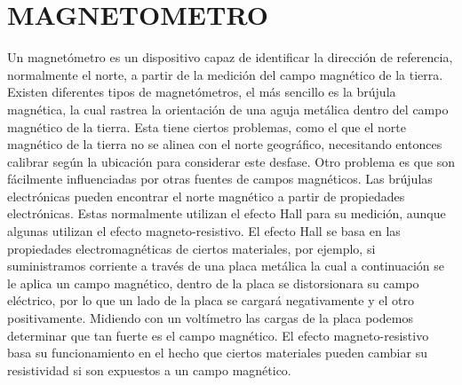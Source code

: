 \documentclass{article}
\begin{document}
 
	\section*{MAGNETOMETRO}
	Un magnetómetro es un dispositivo capaz de identificar la dirección de referencia, normalmente el norte, a partir de la medición del campo magnético de la tierra.
	Existen diferentes tipos de magnetómetros, el más sencillo es la brújula magnética, la cual rastrea la orientación de una aguja metálica dentro del campo magnético de la tierra. Esta tiene ciertos problemas, como el que el norte magnético de la tierra no se alinea con el norte geográfico, necesitando entonces calibrar según la ubicación para considerar este desfase. Otro problema es que son fácilmente influenciadas por otras fuentes de campos magnéticos. 
	Las brújulas electrónicas pueden encontrar el norte magnético a partir de propiedades electrónicas. Estas normalmente utilizan el efecto Hall para su medición, aunque algunas utilizan el efecto magneto-resistivo.
	El efecto Hall se basa en las propiedades electromagnéticas de ciertos materiales, por ejemplo, si suministramos corriente a través de una placa metálica la cual a continuación se le aplica un campo magnético, dentro de la placa se distorsionara su campo eléctrico, por lo que un lado de la placa se cargará negativamente y el otro positivamente. Midiendo con un voltímetro las cargas de la placa podemos determinar que tan fuerte es el campo magnético.
	El efecto magneto-resistivo basa su funcionamiento en el hecho que ciertos materiales pueden cambiar su resistividad si son expuestos a un campo magnético.
\end{document}
